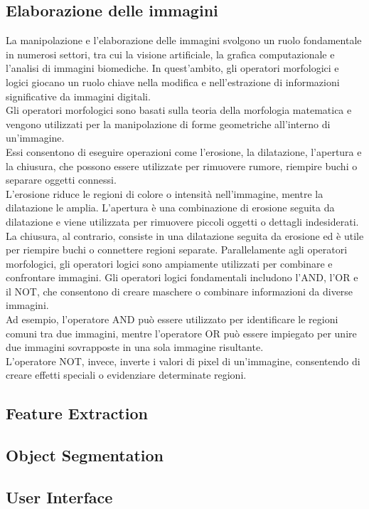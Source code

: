 \documentclass[a4paper,12pt]{report}
\begin{document}
    \subsection{Elaborazione delle immagini}
      La manipolazione e l'elaborazione delle immagini svolgono un ruolo fondamentale in numerosi settori, tra cui la visione artificiale, la grafica computazionale e l'analisi di immagini biomediche. 
      In quest'ambito, gli operatori morfologici e logici giocano un ruolo chiave nella modifica e nell'estrazione di informazioni significative da immagini digitali. \\
      Gli operatori morfologici sono basati sulla teoria della morfologia matematica e vengono utilizzati per la manipolazione di forme geometriche all'interno di un'immagine. \\
      Essi consentono di eseguire operazioni come l'erosione, la dilatazione, l'apertura e la chiusura, che possono essere utilizzate per rimuovere rumore, riempire buchi o separare oggetti connessi. \\
      L'erosione riduce le regioni di colore o intensità nell'immagine, mentre la dilatazione le amplia. L'apertura è una combinazione di erosione seguita da dilatazione e viene utilizzata per rimuovere piccoli oggetti o dettagli indesiderati. La chiusura, al contrario, consiste in una dilatazione seguita da erosione ed è utile per riempire buchi o connettere regioni separate.
      Parallelamente agli operatori morfologici, gli operatori logici sono ampiamente utilizzati per combinare e confrontare immagini. Gli operatori logici fondamentali includono l'AND, l'OR e il NOT, che consentono di creare maschere o combinare informazioni da diverse immagini. \\
      Ad esempio, l'operatore AND può essere utilizzato per identificare le regioni comuni tra due immagini, mentre l'operatore OR può essere impiegato per unire due immagini sovrapposte in una sola immagine risultante. \\
      L'operatore NOT, invece, inverte i valori di pixel di un'immagine, consentendo di creare effetti speciali o evidenziare determinate regioni.
    \subsection{Feature Extraction}
    \subsection{Object Segmentation}
    \subsection{User Interface}
\end{document}
